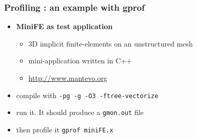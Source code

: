 \begin{frame}[containsverbatim]
	\frametitle{Profiling : an example with gprof}

	\begin{itemize}
	\item {{\bf MiniFE as test application} 
		\begin{itemize}
			\item 3D implicit finite-elements on an unstructured mesh
			\item mini-application written in C++
			\item \url{http://www.mantevo.org}
		\end{itemize}
	}
	\item compile with {\tt -pg -g -O3 -ftree-vectorize}
	\item run it. It should produce a {\tt gmon.out} file
	\item then profile it {\tt gprof miniFE.x}
	\end{itemize}
\end{frame}


